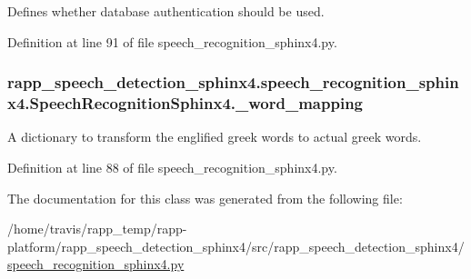Defines whether database authentication should be used. 



Definition at line 91 of file speech\-\_\-recognition\-\_\-sphinx4.\-py.

\hypertarget{classrapp__speech__detection__sphinx4_1_1speech__recognition__sphinx4_1_1SpeechRecognitionSphinx4_a752dac4e406d54c3f27db026dca60334}{
\subsubsection[{\-\_\-word\-\_\-mapping}]{\setlength{\rightskip}{0pt plus 5cm}rapp\-\_\-speech\-\_\-detection\-\_\-sphinx4.\-speech\-\_\-recognition\-\_\-sphinx4.\-Speech\-Recognition\-Sphinx4.\-\_\-word\-\_\-mapping\hspace{0.3cm}{\ttfamily [private]}}}\label{classrapp__speech__detection__sphinx4_1_1speech__recognition__sphinx4_1_1SpeechRecognitionSphinx4_a752dac4e406d54c3f27db026dca60334}


A dictionary to transform the englified greek words to actual greek words. 



Definition at line 88 of file speech\-\_\-recognition\-\_\-sphinx4.\-py.



The documentation for this class was generated from the following file\-:\begin{DoxyCompactItemize}
\item 
/home/travis/rapp\-\_\-temp/rapp-\/platform/rapp\-\_\-speech\-\_\-detection\-\_\-sphinx4/src/rapp\-\_\-speech\-\_\-detection\-\_\-sphinx4/\hyperlink{speech__recognition__sphinx4_8py}{speech\-\_\-recognition\-\_\-sphinx4.\-py}\end{DoxyCompactItemize}
